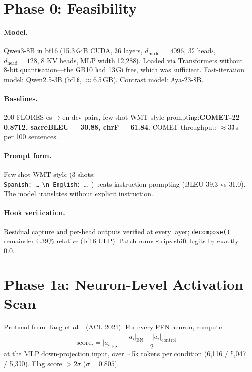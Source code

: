 \documentclass[11pt,a4paper]{article}
\begin{document}
\section{Phase 0: Feasibility}\label{sec:phase0}

\paragraph{Model.} Qwen3-8B in bf16 (15.3\,GiB CUDA, 36 layers, \(d_\text{model}=4096\),
32 heads, \(d_\text{head}=128\), 8 KV heads, MLP width 12,288). Loaded via Transformers
without 8-bit quantisation---the GB10 had 13\,Gi free, which was sufficient.
Fast-iteration model: Qwen2.5-3B (bf16, $\approx$6.5\,GB). Contrast model: Aya-23-8B.

\paragraph{Baselines.} 200 FLORES es$\rightarrow$en dev pairs, few-shot WMT-style
prompting:\textbf{COMET-22 = 0.8712, sacreBLEU = 30.88, chrF = 61.84}.
COMET throughput: $\approx$33\,s per 100 sentences.

\paragraph{Prompt form.} Few-shot WMT-style (3 shots: \\
\texttt{Spanish: \dots\ \textbackslash n English: \dots\ }) beats instruction prompting
(BLEU 39.3 vs 31.0). The model translates without explicit instruction.

\paragraph{Hook verification.} Residual capture and per-head outputs verified at every
layer; \texttt{decompose()} remainder 0.39\% relative (bf16 ULP). Patch round-trips shift
logits by exactly 0.0.

\section{Phase 1a: Neuron-Level Activation Scan}

Protocol from Tang et al.~\cite{languageneurons} (ACL 2024). For every FFN neuron,
compute
\[
\text{score}_i = \overline{|a_i|}_\text{ES} - \frac{\overline{|a_i|}_\text{EN} + \overline{|a_i|}_\text{control}}{2}
\]
at the MLP down-projection input, over $\sim$5k tokens per condition
(6,116 / 5,047 / 5,300). Flag score $>2\sigma$ ($\sigma=0.805$).
\end{document}
